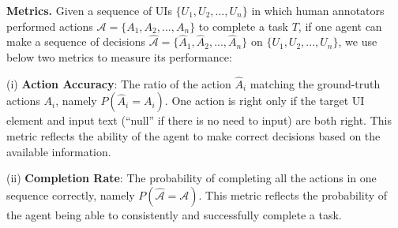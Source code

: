\textbf{Metrics.}
Given a sequence of UIs $\{U_1, U_2, ..., U_n\}$ in which human annotators performed actions $\mathcal{A}=\{A_1, A_2, ..., A_n\}$ to complete a task $T$, if one agent can make a sequence of decisions $\hat{\mathcal{A}}=\{\hat{A}_1, \hat{A}_2, ..., \hat{A}_n\}$ on $\{U_1, U_2, ..., U_n\}$, we use below two metrics to measure its performance:

(i) \textbf{Action Accuracy}: The ratio of the action $\hat{A}_i$ matching the ground-truth actions $A_i$, namely $P(\hat{A}_i=A_i)$. One action is right only if the target UI element and input text (``null'' if there is no need to input) are both right. This metric reflects the ability of the agent to make correct decisions based on the available information.

(ii) \textbf{Completion Rate}: The probability of completing all the actions in one sequence correctly, namely $P(\hat{\mathcal{A}}=\mathcal{A})$. This metric reflects the probability of the agent being able to consistently and successfully complete a task. 

